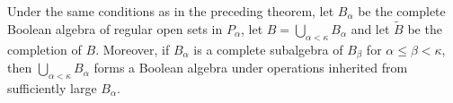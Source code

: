 Under the same conditions as in the preceding theorem, let $B_{\alpha}$ be the complete Boolean algebra of regular open sets in $P_{\alpha}$, let $B = \bigcup_{\alpha < \kappa} B_{\alpha}$ and let $\tilde{B}$ be the completion of $B$. Moreover, if $B_{\alpha}$ is a complete subalgebra of $B_{\beta}$ for $\alpha \leq \beta < \kappa$, then $\bigcup_{\alpha < \kappa} B_{\alpha}$ forms a Boolean algebra under operations inherited from sufficiently large $B_{\alpha}$.$$

